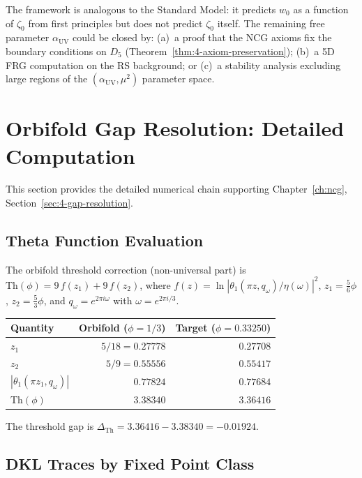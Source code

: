 \noindent
The framework is analogous to the Standard Model: it predicts $w_0$ as a function of $\zeta_0$ from first principles but does not predict $\zeta_0$ itself. The remaining free parameter $\alpha_{\mathrm{UV}}$ could be closed by: (a)~a proof that the NCG axioms fix the boundary conditions on $D_5$ (Theorem~\ref{thm:4-axiom-preservation}); (b)~a 5D FRG computation on the RS background; or (c)~a stability analysis excluding large regions of the $(\alpha_{\mathrm{UV}}, \mu^2)$ parameter space.


\section{Orbifold Gap Resolution: Detailed Computation}
\label{app:gap-resolution}

This section provides the detailed numerical chain supporting Chapter~\ref{ch:ncg}, Section~\ref{sec:4-gap-resolution}.

\subsection{Theta Function Evaluation}
\label{app:gap-theta}

The orbifold threshold correction (non-universal part) is $\mathrm{Th}(\phi) = 9\,f(z_1) + 9\,f(z_2)$, where $f(z) = \ln|\theta_1(\pi z, q_\omega)/\eta(\omega)|^2$, $z_1 = \tfrac{5}{6}\phi$, $z_2 = \tfrac{5}{3}\phi$, and $q_\omega = e^{2\pi i \omega}$ with $\omega = e^{2\pi i/3}$.

\begin{center}
\begin{tabular}{l r r}
\hline
Quantity & Orbifold ($\phi = 1/3$) & Target ($\phi = 0.33250$) \\
\hline
$z_1$ & $5/18 = 0.27778$ & $0.27708$ \\
$z_2$ & $5/9 = 0.55556$ & $0.55417$ \\
$|\theta_1(\pi z_1, q_\omega)|$ & $0.77824$ & $0.77684$ \\
$\mathrm{Th}(\phi)$ & $3.38340$ & $3.36416$ \\
\hline
\end{tabular}
\end{center}

The threshold gap is $\Delta_{\mathrm{Th}} = 3.36416 - 3.38340 = -0.01924$.

\subsection{DKL Traces by Fixed Point Class}
\label{app:gap-dkl}

